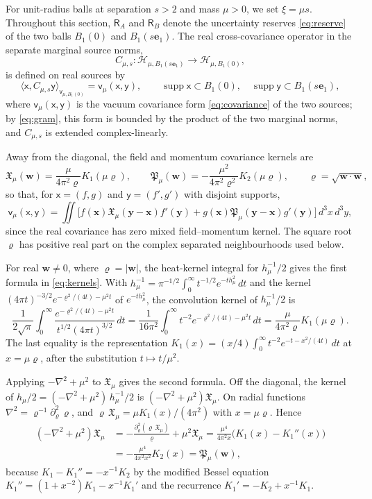 \documentclass[11pt]{amsart}
\numberwithin{equation}{section}
\theoremstyle{definition}
\newcommand{\Hh}{\mathcal H}
\newcommand{\vv}{\mathsf v}
\newcommand{\Res}{\mathsf R}
\newcommand{\sx}{\mathsf x}
\newcommand{\sy}{\mathsf y}
\newcommand{\bx}{\mathbf x}
\newcommand{\by}{\mathbf y}
\newcommand{\eone}{\mathbf e_1}
\newcommand{\supp}{\operatorname{supp}}
\newcommand{\ip}[2]{\langle #1,#2\rangle}
\begin{document}
For unit-radius balls at separation \(s>2\) and mass \(\mu>0\), we set
\(\xi=\mu s\). Throughout this section, \(\Res_A\) and \(\Res_B\)
denote the uncertainty reserves \eqref{eq:reserve} of the two balls
\(B_1(0)\) and \(B_1(s\eone)\). The real cross-covariance operator in
the separate marginal source norms,
\[
 C_{\mu,s}:\Hh_{\mu,B_1(s\eone)}
 \longrightarrow\Hh_{\mu,B_1(0)},
\]
is defined on real sources by
\[
 \ip{\sx}{C_{\mu,s}\sy}_{\vv_{\mu,B_1(0)}}
 =\vv_\mu(\sx,\sy),
 \qquad
 \supp\sx\subset B_1(0),\quad \supp\sy\subset B_1(s\eone),
\]
where \(\vv_\mu(\sx,\sy)\) is the vacuum covariance form
\eqref{eq:covariance} of the two sources; by \eqref{eq:gram}, this
form is bounded by the product of the two marginal norms, and
\(C_{\mu,s}\) is extended complex-linearly.

Away from the diagonal, the field and momentum covariance kernels are
\begin{equation}
 \mathfrak X_\mu(\mathbf w)
 =\frac{\mu}{4\pi^2\varrho}K_1(\mu\varrho),\qquad
 \mathfrak P_\mu(\mathbf w)
 =-\frac{\mu^2}{4\pi^2\varrho^2}K_2(\mu\varrho),
 \qquad \varrho=\sqrt{\mathbf w\cdot\mathbf w},
 \label{eq:kernels}
\end{equation}
so that, for \(\sx=(f,g)\) and \(\sy=(f',g')\) with disjoint supports,
\[
 \vv_\mu(\sx,\sy)=\iint\bigl[f(\bx)\mathfrak X_\mu(\by-\bx)f'(\by)
 +g(\bx)\mathfrak P_\mu(\by-\bx)g'(\by)\bigr]\,d^3x\,d^3y,
\]
since the real covariance has zero mixed field--momentum kernel. The
square root \(\varrho\) has positive real part on the complex separated
neighbourhoods used below.

For real \(\mathbf w\ne0\), where \(\varrho=|\mathbf w|\), the
heat-kernel integral for \(h_\mu^{-1}/2\) gives the first formula in
\eqref{eq:kernels}. With
\(h_\mu^{-1}=\pi^{-1/2}\int_0^\infty t^{-1/2}e^{-th_\mu^2}\,dt\) and the
kernel \((4\pi t)^{-3/2}e^{-\varrho^2/(4t)-\mu^2t}\) of
\(e^{-th_\mu^2}\), the convolution kernel of \(h_\mu^{-1}/2\) is
\[
 \frac1{2\sqrt\pi}\int_0^\infty
 \frac{e^{-\varrho^2/(4t)-\mu^2t}}{t^{1/2}(4\pi t)^{3/2}}\,dt
 =\frac1{16\pi^2}\int_0^\infty t^{-2}e^{-\varrho^2/(4t)-\mu^2t}\,dt
 =\frac{\mu}{4\pi^2\varrho}K_1(\mu\varrho).
\]
The last equality is the representation
\(K_1(x)=(x/4)\int_0^\infty t^{-2}e^{-t-x^2/(4t)}\,dt\)
\cite[Eq.~10.32.10]{DLMF} at \(x=\mu\varrho\), after the substitution
\(t\mapsto t/\mu^2\).

Applying \(-\nabla^2+\mu^2\) to \(\mathfrak X_\mu\) gives the second formula. Off the
diagonal, the kernel of \(h_\mu/2=(-\nabla^2+\mu^2)\,h_\mu^{-1}/2\) is
\((-\nabla^2+\mu^2)\mathfrak X_\mu\). On radial functions
\(\nabla^2=\varrho^{-1}\partial_\varrho^2\,\varrho\), and
\(\varrho\,\mathfrak X_\mu=\mu K_1(x)/(4\pi^2)\) with \(x=\mu\varrho\).
Hence
\[
 \begin{split}
 (-\nabla^2+\mu^2)\mathfrak X_\mu
 &=-\frac{\partial_\varrho^2(\varrho\,\mathfrak X_\mu)}{\varrho}
 +\mu^2\mathfrak X_\mu
 =\frac{\mu^4}{4\pi^2x}\bigl(K_1(x)-K_1''(x)\bigr)\\
 &=-\frac{\mu^4}{4\pi^2x^2}K_2(x)
 =\mathfrak P_\mu(\mathbf w),
 \end{split}
\]
because \(K_1-K_1''=-x^{-1}K_2\) by the modified Bessel equation
\(K_1''=(1+x^{-2})K_1-x^{-1}K_1'\) and the recurrence
\(K_1'=-K_2+x^{-1}K_1\).
\end{document}
